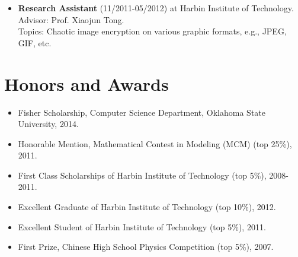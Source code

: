 \documentclass{article}
\begin{document}
\begin{itemize}
\item {\bf Research Assistant} (11/2011-05/2012) at Harbin Institute of Technology.\\
Advisor: Prof. Xiaojun Tong.\\
Topics: Chaotic image encryption on various graphic formats, e.g., JPEG, GIF, etc.
\end{itemize}

\section{{Honors and Awards}}
\begin{itemize}
\item Fisher Scholarship, Computer Science Department, Oklahoma State University, 2014.
\item Honorable Mention, Mathematical Contest in Modeling (MCM) (top 25\%), 2011.
\item First Class Scholarships of Harbin Institute of Technology (top 5\%), 2008-2011.
\item Excellent Graduate of Harbin Institute of Technology (top 10\%), 2012.
\item Excellent Student of Harbin Institute of Technology (top 5\%), 2011.
\item First Prize, Chinese High School Physics Competition (top 5\%), 2007.
\end{itemize}
\end{document}
